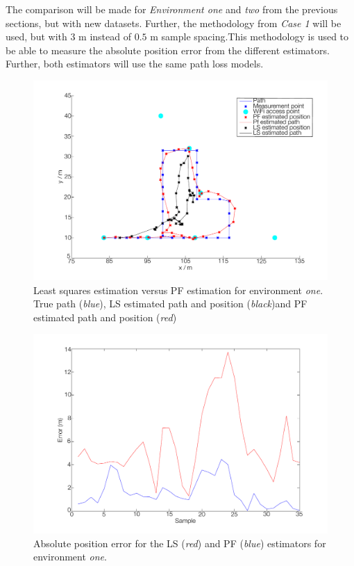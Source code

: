 \documentclass{LTHthesis}
\begin{document}
The comparison will be made for \emph{Environment one} and \emph{two} from the previous sections, but with new datasets. Further, the methodology from \emph{Case 1} will be used, but with 3 m instead of $0.5$ m sample spacing.This methodology is used to be able to measure the absolute position error from the different estimators. Further, both estimators will use the same path loss models.   
%
\begin{figure}[!hbt]

\includegraphics[width=1\textwidth ]{images/pure_rssi/ls_short_path}
\caption{Least squares estimation versus PF estimation for environment \emph{one}. True path (\emph{blue}), LS estimated path and position (\emph{black})and PF estimated path and position (\emph{red})}\label{ls_short}
\end{figure}
%
\begin{figure}[!hbt]

\includegraphics[width=1\textwidth ]{images/pure_rssi/ls_error_short}
\caption{Absolute position error for the LS (\emph{red}) and PF (\emph{blue}) estimators for environment \emph{one}.}\label{ls_error_short}
\end{figure}
\end{document}
